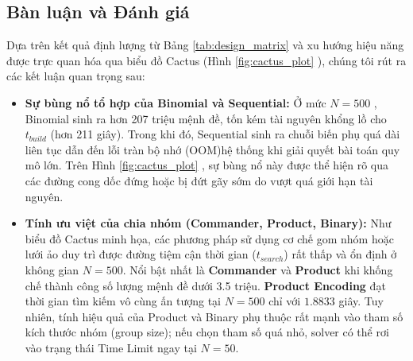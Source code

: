 \documentclass[a4paper,fleqn,numbers]{cas-sc}
\begin{document}
    \subsection{Bàn luận và Đánh giá}
    Dựa trên kết quả định lượng từ Bảng \ref{tab:design_matrix}
    và xu hướng hiệu năng được trực quan hóa qua biểu đồ Cactus (Hình \ref{fig:cactus_plot}
    ), chúng tôi rút ra các kết luận quan trọng sau:

    \begin{itemize}
        \item \textbf{Sự bùng nổ tổ hợp của Binomial và Sequential:} Ở mức $N=500$
        , Binomial sinh ra hơn 207 triệu mệnh đề, tốn kém tài nguyên khổng lồ cho $t_{build}$
        (hơn 211 giây). Trong khi đó, Sequential sinh ra chuỗi biến phụ quá dài liên tục dẫn đến lỗi tràn bộ nhớ (OOM)hệ
        thống khi giải quyết bài toán quy mô lớn. Trên Hình \ref{fig:cactus_plot}
        , sự bùng nổ này được thể hiện rõ qua các đường cong dốc đứng hoặc bị đứt gãy sớm do vượt quá giới hạn tài
        nguyên.

        \item \textbf{Tính ưu việt của chia nhóm (Commander, Product, Binary):}
        Như biểu đồ Cactus minh họa, các phương pháp sử dụng cơ chế gom nhóm hoặc lưới ảo duy trì được đường tiệm cận
        thời gian ($t_{search}$) rất thấp và ổn định ở không gian $N=500$. Nổi bật nhất là \textbf{Commander} và
        \textbf{Product} khi khống chế thành công số lượng mệnh đề dưới 3.5 triệu. \textbf{Product Encoding}
        đạt thời gian tìm kiếm vô cùng ấn tượng tại $N=500$ chỉ với $1.8833$
        giây. Tuy nhiên, tính hiệu quả của Product và Binary phụ thuộc rất mạnh vào tham số kích thước nhóm (group
        size); nếu chọn tham số quá nhỏ, solver có thể rơi vào trạng thái Time Limit ngay tại $N=50$.


\end{itemize}
\end{document}
